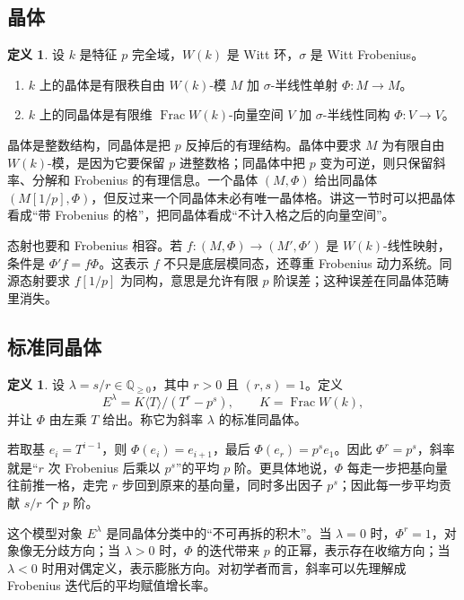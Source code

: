 \documentclass[11pt,a4paper,openany]{ctexbook}
\numberwithin{equation}{chapter}
\newcommand{\Q}{\mathbb{Q}}
\theoremstyle{plain}
\theoremstyle{definition}
\newtheorem{definition}[theorem]{定义}
\theoremstyle{remark}
\begin{document}
\subsection{晶体}

\begin{definition}
设 $k$ 是特征 $p$ 完全域，$W(k)$ 是 Witt 环，$\sigma$ 是 Witt Frobenius。
\begin{enumerate}[label=(\arabic*)]
\item $k$ 上的晶体是有限秩自由 $W(k)$-模 $M$ 加 $\sigma$-半线性单射 $\Phi:M\to M$。
\item $k$ 上的同晶体是有限维 $\operatorname{Frac}W(k)$-向量空间 $V$ 加 $\sigma$-半线性同构 $\Phi:V\to V$。
\end{enumerate}
\end{definition}

晶体是整数结构，同晶体是把 $p$ 反掉后的有理结构。晶体中要求 $M$ 为有限自由 $W(k)$-模，是因为它要保留 $p$ 进整数格；同晶体中把 $p$ 变为可逆，则只保留斜率、分解和 Frobenius 的有理信息。一个晶体 $(M,\Phi)$ 给出同晶体 $(M[1/p],\Phi)$，但反过来一个同晶体未必有唯一晶体格。讲这一节时可以把晶体看成“带 Frobenius 的格”，把同晶体看成“不计入格之后的向量空间”。

态射也要和 Frobenius 相容。若 $f:(M,\Phi)\to(M',\Phi')$ 是 $W(k)$-线性映射，条件是 $\Phi' f=f\Phi$。这表示 $f$ 不只是底层模同态，还尊重 Frobenius 动力系统。同源态射要求 $f[1/p]$ 为同构，意思是允许有限 $p$ 阶误差；这种误差在同晶体范畴里消失。

\subsection{标准同晶体}

\begin{definition}
设 $\lambda=s/r\in\Q_{\ge0}$，其中 $r>0$ 且 $(r,s)=1$。定义
\[
  E^\lambda=K\langle T\rangle/(T^r-p^s),
  \qquad K=\operatorname{Frac}W(k),
\]
并让 $\Phi$ 由左乘 $T$ 给出。称它为斜率 $\lambda$ 的标准同晶体。
\end{definition}

若取基 $e_i=T^{i-1}$，则 $\Phi(e_i)=e_{i+1}$，最后 $\Phi(e_r)=p^se_1$。因此 $\Phi^r=p^s$，斜率就是“$r$ 次 Frobenius 后乘以 $p^s$”的平均 $p$ 阶。更具体地说，$\Phi$ 每走一步把基向量往前推一格，走完 $r$ 步回到原来的基向量，同时多出因子 $p^s$；因此每一步平均贡献 $s/r$ 个 $p$ 阶。

这个模型对象 $E^\lambda$ 是同晶体分类中的“不可再拆的积木”。当 $\lambda=0$ 时，$\Phi^r=1$，对象像无分歧方向；当 $\lambda>0$ 时，$\Phi$ 的迭代带来 $p$ 的正幂，表示存在收缩方向；当 $\lambda<0$ 时用对偶定义，表示膨胀方向。对初学者而言，斜率可以先理解成 Frobenius 迭代后的平均赋值增长率。
\end{document}
